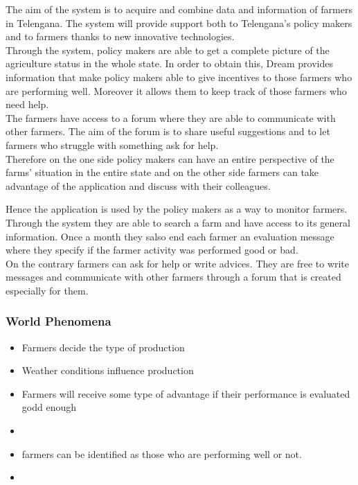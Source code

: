 The aim of the system is to acquire and combine data and information of farmers in Telengana. 
The system will provide support both to Telengana’s policy makers and to farmers 
thanks to new innovative technologies.\\
Through the system, policy makers are able 
to get a complete picture of the agriculture status in the whole state. In order 
to obtain this, Dream provides information that make policy makers able to give 
incentives to those farmers who are performing well. Moreover it allows them to 
keep track of those farmers who need help. \\
The farmers have access to a forum where they are able to communicate with other 
farmers. The aim of the forum is to share useful suggestions and to let farmers 
who struggle with something ask for help. \\
Therefore on the one side policy makers can have an entire perspective of the farms’ 
situation in the entire state and on the other side farmers can take advantage of the 
application and discuss with their colleagues.
\par 
Hence the application is used by the policy makers as a way to monitor farmers. 
Through the system they are able to search a farm and have access to its general information. 
Once a month they salso end each farmer an evaluation message where they specify if the farmer activity was
performed good or bad.\\
On the contrary farmers can ask for help or write advices. They are free to write messages and communicate with other farmers through a forum 
that is created especially for them.




\subsubsection{World Phenomena}
\begin{itemize}
    \item Farmers decide the type of production
    \item Weather conditions influence production
    \item Farmers will receive some type of advantage if their performance is evaluated godd enough
    \item 
    \item farmers can be identified as those who are performing well or not.
    \item 
\end{itemize}

